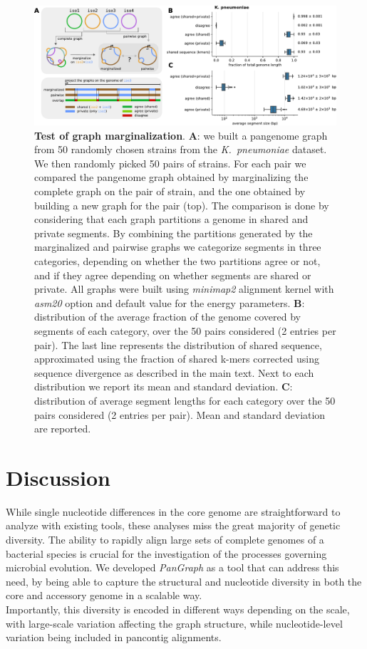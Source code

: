 \documentclass[aps,rmp,preprint,superscriptaddress,10pt,linenumbers]{revtex4-1}
\begin{document}
\begin{figure}[htb]
    \includegraphics[width=\textwidth]{figs/marginalize_test.pdf}
    \caption{{\bf Test of graph marginalization}.
        \textbf{A}: we built a pangenome graph from 50 randomly chosen strains from the \textit{K.~pneumoniae} dataset. We then randomly picked 50 pairs of strains. For each pair we compared the pangenome graph obtained by marginalizing the complete graph on the pair of strain, and the one obtained by building a new graph for the pair (top). The comparison is done by considering that each graph partitions a genome in shared and private segments. By combining the partitions generated by the marginalized and pairwise graphs we categorize segments in three categories, depending on whether the two partitions agree or not, and if they agree depending on whether segments are shared or private. All graphs were built using \textit{minimap2} alignment kernel with \textit{asm20} option and default value for the energy parameters.
        \textbf{B}: distribution of the average fraction of the genome covered by segments of each category, over the 50 pairs considered (2 entries per pair). The last line represents the distribution of shared sequence, approximated using the fraction of shared k-mers corrected using sequence divergence as described in the main text. Next to each distribution we report its mean and standard deviation.
        \textbf{C}: distribution of average segment lengths for each category over the 50 pairs considered (2 entries per pair). Mean and standard deviation are reported.
    }
    \label{fig:marginalization}
\end{figure}



\section{Discussion}

While single nucleotide differences in the core genome are straightforward to analyze with existing tools, these analyses miss the great majority of genetic diversity. The ability to rapidly align large sets of complete genomes of a bacterial species is crucial for the investigation of the processes governing microbial evolution. We developed \textit{PanGraph} as a tool that can address this need, by being able to capture the structural and nucleotide diversity in both the core and accessory genome in a scalable way.\\
Importantly, this diversity is encoded in different ways depending on the scale, with large-scale variation affecting the graph structure, while nucleotide-level variation being included in pancontig alignments.\\
\end{document}
